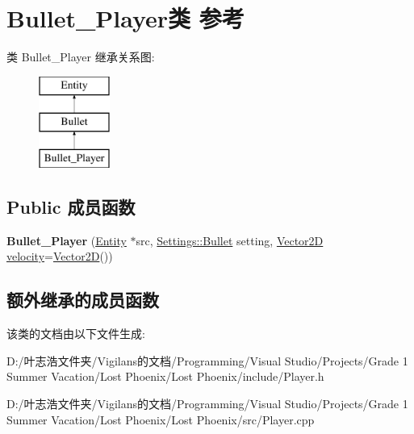 \hypertarget{class_bullet___player}{}\section{Bullet\+\_\+\+Player类 参考}
\label{class_bullet___player}
类 Bullet\+\_\+\+Player 继承关系图\+:\begin{figure}[H]
\begin{center}
\leavevmode
\includegraphics[height=3.000000cm]{class_bullet___player}
\end{center}
\end{figure}
\subsection*{Public 成员函数}
\begin{DoxyCompactItemize}
\item 
\mbox{\label{class_bullet___player_abcb87ef10b028f5fd603c70b4cda20d3}} 
{\bfseries Bullet\+\_\+\+Player} (\hyperlink{class_entity}{Entity} $\ast$src, \hyperlink{struct_settings_1_1_bullet}{Settings\+::\+Bullet} setting, \hyperlink{structbasic__vector2_d}{Vector2D} \hyperlink{class_entity_a386d25b56772b8913eb3e5adc636f6e0}{velocity}=\hyperlink{structbasic__vector2_d}{Vector2D}())
\end{DoxyCompactItemize}
\subsection*{额外继承的成员函数}


该类的文档由以下文件生成\+:\begin{DoxyCompactItemize}
\item 
D\+:/叶志浩文件夹/\+Vigilans的文档/\+Programming/\+Visual Studio/\+Projects/\+Grade 1 Summer Vacation/\+Lost Phoenix/\+Lost Phoenix/include/Player.\+h\item 
D\+:/叶志浩文件夹/\+Vigilans的文档/\+Programming/\+Visual Studio/\+Projects/\+Grade 1 Summer Vacation/\+Lost Phoenix/\+Lost Phoenix/src/Player.\+cpp\end{DoxyCompactItemize}
